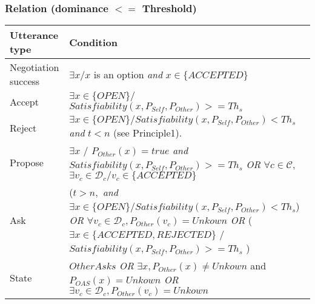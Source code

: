 \documentclass{article}
\begin{document}
	\subsubsection{Relation (\textbf{dominance $<=$ Threshold})}
	\begin{tabular}{|p{3cm}|p{9cm}|}
		\hline
		\textbf{Utterance type} & Condition \\
		\hline
		Negotiation success &  $\exists x/ x$ is an option \emph{and} $x \in \{ACCEPTED\}$ \\
		\hline
		Accept & $\exists x \in \{OPEN\} /$  $Satisfiability(x, P_{Self}, P_{Other}) >= Th_s$ \\
		\hline
		Reject & $\exists x \in \{OPEN\} / Satisfiability(x, P_{Self}, P_{Other}) < Th_s$  \emph{and} $t<n$ (see Principle1).\\
		\hline
		Propose & $\exists x$ / $P_{Other} (x)= true $  \emph{and}
		\newline $Satisfiability(x, P_{Self}, P_{Other}) >= Th_s$
		\newline \emph{OR}  
		\newline $\forall c \in \mathcal{C}$, $\exists v_c \in \mathcal{D}_c / v_c \in \{ACCEPTED\}$\\
		\hline
		Ask &  ($t>n,$ \emph{and} 
		\newline $\exists x \in \{OPEN\} /  Satisfiability(x, P_{Self}, P_{Other}) < Th_s $) 
		\newline \emph{OR}
		\newline $ \forall v_c \in \mathcal{D}_c, P_{Other}(v_c) = Unkown$
		\newline \emph{OR} 
		\newline ($\exists x \in \{ACCEPTED, REJECTED\}$ / 
		\newline $Satisfiability(x, P_{Self}, P_{Other}) >= Th_s$ ) \\
		\hline
		
		State & $OtherAsks$
		\newline \emph{OR}
		\newline $\exists x,P_{Other}(x) \not = Unkown $ and $P_{OAS}(x) = Unkown$ 
		\newline \emph{OR}
		\newline $ \exists v_c \in \mathcal{D}_c, P_{Other}(v_c) = Unkown$
		\\
		\hline
	\end{tabular}
	
%	
%	
%	
	
\end{document}
